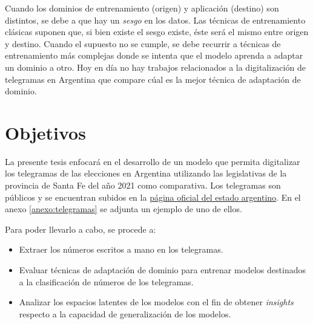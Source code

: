 Cuando los dominios de entrenamiento (origen) y aplicaci\'on (destino) son distintos, se debe a que hay un {\it sesgo}
en los datos. Las t\'ecnicas de entrenamiento cl\'asicas suponen que, si bien existe el sesgo existe, \'este ser\'a el
mismo entre origen y destino. Cuando el supuesto no se cumple, se debe recurrir a t\'ecnicas de entrenamiento m\'as
complejas donde se intenta que el modelo aprenda a adaptar un dominio a otro. Hoy en d\'ia no hay trabajos relacionados
a la digitalizaci\'on de telegramas en Argentina que compare c\'ual es la mejor t\'ecnica de adaptaci\'on de dominio.

\section{Objetivos}

La presente tesis enfocar\'a en el desarrollo de un modelo que permita digitalizar los telegramas de las elecciones en
Argentina utilizando las legislativas de la provincia de Santa Fe del a\~{n}o 2021 como comparativa. Los telegramas son
p\'ublicos y se encuentran subidos en la \href{https://op.elecciones.gob.ar/telegramas/generales2021/}{p\'agina oficial
    del estado argentino}. En el anexo \ref{anexo:telegramas} se adjunta un ejemplo de uno de ellos.

Para poder llevarlo a cabo, se procede a:
\begin{itemize}
    \item Extraer los n\'umeros escritos a mano en los telegramas.
    \item Evaluar t\'ecnicas de adaptaci\'on de dominio para entrenar modelos destinados a la clasificaci\'on de n\'umeros de los
          telegramas.
    \item Analizar los espacios latentes de los modelos con el fin de obtener {\it insights} respecto a la capacidad de
          generalizaci\'on de los modelos.
\end{itemize}